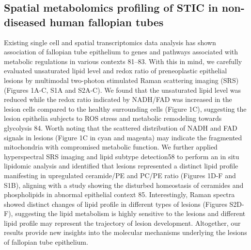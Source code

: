 \begin{refsection}
    \subsection{Spatial metabolomics profiling of STIC in non-diseased human fallopian tubes}
    Existing single cell and spatial transcriptomics data analysis has shown association of fallopian tube epithelium to genes and pathways associated with metabolic regulations in various contexts 81–83. With this in mind, we carefully evaluated unsaturated lipid level and redox ratio of preneoplastic epithelial lesions by multimodal two-photon stimulated Raman scattering imaging (SRS) (Figures 1A-C, S1A and S2A-C). We found that the unsaturated lipid level was reduced while the redox ratio indicated by NADH/FAD was increased in the lesion cells compared to the healthy surrounding cells (Figure 1C), suggesting the lesion epithelia subjects to ROS stress and metabolic remodeling towards glycolysis 84. Worth noting that the scattered distribution of NADH and FAD signals in lesions (Figure 1C in cyan and magenta) may indicate the fragmented mitochondria with compromised metabolic function.  We further applied hyperspectral SRS imaging and lipid subtype detection58 to perform an in situ lipidomic analysis and identified that lesions represented a distinct lipid profile manifesting in upregulated ceramide/PE and PC/PE ratio (Figures 1D-F and S1B), aligning with a study showing the disturbed homeostasis of ceramides and phospholipids in abnormal epithelial context 85. 
    Interestingly, Raman spectra showed distinct changes of lipid profile in different types of lesions (Figures S2D-F), suggesting the lipid metabolism is highly sensitive to the lesions and different lipid profile may represent the trajectory of lesion development. Altogether, our results provide new insights into the molecular mechanisms underlying the lesions of fallopian tube epithelium.
    

\end{refsection}

